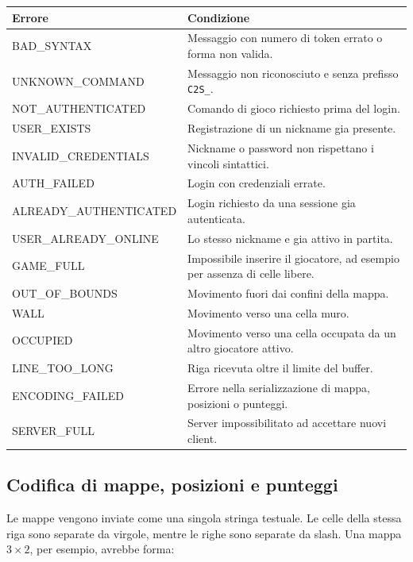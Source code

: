 \documentclass[11pt,a4paper]{article}
\begin{document}
\begin{center}
\begin{tabular}{>{\ttfamily}p{4.9cm}p{8.8cm}}
\toprule
\normalfont\textbf{Errore} & \textbf{Condizione} \\
\midrule

BAD\_SYNTAX & Messaggio con numero di token errato o forma non valida. \\
UNKNOWN\_COMMAND & Messaggio non riconosciuto e senza prefisso \texttt{C2S\_}. \\
NOT\_AUTHENTICATED & Comando di gioco richiesto prima del login. \\
USER\_EXISTS & Registrazione di un nickname gia presente. \\
INVALID\_CREDENTIALS & Nickname o password non rispettano i vincoli sintattici. \\
AUTH\_FAILED & Login con credenziali errate. \\
ALREADY\_AUTHENTICATED & Login richiesto da una sessione gia autenticata. \\
USER\_ALREADY\_ONLINE & Lo stesso nickname e gia attivo in partita. \\
GAME\_FULL & Impossibile inserire il giocatore, ad esempio per assenza di celle libere. \\
OUT\_OF\_BOUNDS & Movimento fuori dai confini della mappa. \\
WALL & Movimento verso una cella muro. \\
OCCUPIED & Movimento verso una cella occupata da un altro giocatore attivo. \\
LINE\_TOO\_LONG & Riga ricevuta oltre il limite del buffer. \\
ENCODING\_FAILED & Errore nella serializzazione di mappa, posizioni o punteggi. \\
SERVER\_FULL & Server impossibilitato ad accettare nuovi client. \\

\bottomrule
\end{tabular}
\end{center}

\subsection{Codifica di mappe, posizioni e punteggi}

Le mappe vengono inviate come una singola stringa testuale. Le celle della stessa riga sono separate da virgole, mentre le righe sono separate da slash. Una mappa \(3 \times 2\), per esempio, avrebbe forma:
\end{document}
